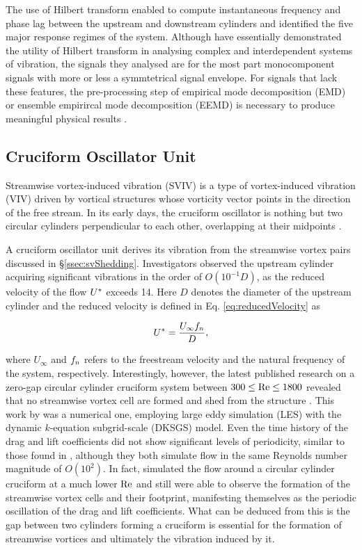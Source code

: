 \documentclass[oneside]{utmthesis}
\begin{document}
The use of Hilbert transform enabled \citet{Yuan2020} to compute instantaneous frequency and phase lag between the upstream and downstream cylinders and identified the five major response regimes of the system. Although \citet{Yuan2020} have essentially demonstrated the utility of Hilbert transform in analysing complex and interdependent systems of vibration, the signals they analysed are for the most part monocomponent signals with more or less a symmtetrical signal envelope. For signals that lack these features, the pre-processing step of empirical mode decomposition (EMD) or ensemble empirircal mode decomposition (EEMD) is necessary to produce meaningful physical results \citep{Huang2014,Chen2019}.

\subsection{Cruciform Oscillator Unit}
Streamwise vortex-induced vibration (SVIV) is a type of vortex-induced vibration (VIV) driven by vortical structures whose vorticity vector points in the direction of the free stream. In its early days, the cruciform oscillator is nothing but two circular cylinders perpendicular to each other, overlapping at their midpoints \citep{Zdravkovich1981,Zdravkovich1983,Zdravkovich1985}.

A cruciform oscillator unit derives its vibration from the streamwise vortex pairs discussed in \S\ref{ssec:svShedding}. Investigators observed the upstream cylinder acquiring significant vibrations in the order of $O(10^{-1}D)$, as the reduced velocity of the flow $U^{*}$ exceeds 14. Here $D$ denotes the diameter of the upstream cylinder and the reduced velocity is defined in Eq. \ref{eq:reducedVelocity} as

\begin{equation}
  U^{*} = \frac{U_{\infty} f_{n}}{D},
  \label{eq:reducedVelocity}
\end{equation}

\noindent where $U_{\infty}$ and $f_{n}$ refers to the freestream velocity and the natural frequency of the system, respectively. Interestingly, however, the latest published research on a zero-gap circular cylinder cruciform system between $300 \le \text{Re} \le 1800$ revealed that no streamwise vortex cell are formed and shed from the structure \citep{Tang2021}. This work by \citet{Tang2021} was a numerical one, employing large eddy simulation (LES) with the dynamic $k$-equation subgrid-scale (DKSGS) model. Even the time history of the drag and lift coefficients did not show significant levels of periodicity, similar to those found in \citet{Deng2007}, although they both simulate flow in the same Reynolds number magnitude of $O(10^{2})$. In fact, \citet{Deng2007} simulated the flow around a circular cylinder cruciform at a much lower $\text{Re}$ and still were able to observe the formation of the streamwise vortex cells and their footprint, manifesting themselves as the periodic oscillation of the drag and lift coefficients. What can be deduced from this is the gap between two cylinders forming a cruciform is essential for the formation of streamwise vortices and ultimately the vibration induced by it.
\end{document}
